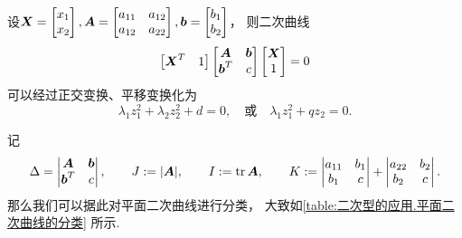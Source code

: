\begin{theorem}[平面二次曲线的分类定理]
设\(\boldsymbol{X} = \begin{bmatrix}
	x_1 \\ x_2
\end{bmatrix},
\boldsymbol{A} = \begin{bmatrix}
	a_{11} & a_{12} \\
	a_{12} & a_{22}
\end{bmatrix},
\boldsymbol{b} = \begin{bmatrix}
	b_1 \\ b_2
\end{bmatrix}\)，
则二次曲线\begin{equation*}
	\begin{bmatrix}
		\boldsymbol{X}^T & 1
	\end{bmatrix}
	\begin{bmatrix}
		\boldsymbol{A} & \boldsymbol{b} \\
		\boldsymbol{b}^T & c
	\end{bmatrix}
	\begin{bmatrix}
		\boldsymbol{X} \\ 1
	\end{bmatrix}
	= 0
\end{equation*}可以经过正交变换、平移变换化为\begin{equation*}
	\lambda_1 z_1^2 + \lambda_2 z_2^2 + d = 0,
	\quad\text{或}\quad
	\lambda_1 z_1^2 + q z_2 = 0.
\end{equation*}
\end{theorem}

记\begin{equation*}
	\Delta = \begin{vmatrix}
		\boldsymbol{A} & \boldsymbol{b} \\
		\boldsymbol{b}^T & c
	\end{vmatrix},
	\qquad
	J := \abs{\boldsymbol{A}},
	\qquad
	I := \tr\boldsymbol{A},
	\qquad
	K := \begin{vmatrix}
		a_{11} & b_1 \\
		b_1 & c
	\end{vmatrix}
	+ \begin{vmatrix}
		a_{22} & b_2 \\
		b_2 & c
	\end{vmatrix}.
\end{equation*}
那么我们可以据此对平面二次曲线进行分类，
大致如\cref{table:二次型的应用.平面二次曲线的分类} 所示.


